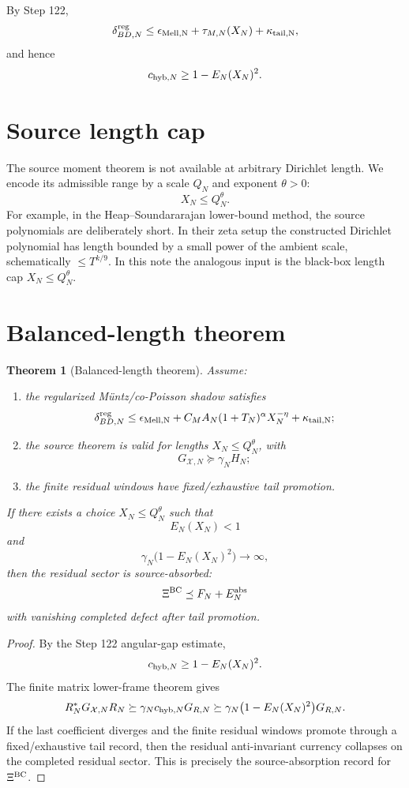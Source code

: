 \documentclass[11pt]{article}
\newtheorem{theorem}{Theorem}
\begin{document}
By Step 122,
\[
\delta^{\rm reg}_{BD,N}\le \epsilon_{\rm Mell,N}+\tau_{M,N}(X_N)+\kappa_{\rm tail,N},
\]
and hence
\[
c_{{\rm hyb},N}\ge 1-E_N(X_N)^2.
\]

\section{Source length cap}
The source moment theorem is not available at arbitrary Dirichlet length.  We encode its admissible range by a scale \(Q_N\) and exponent \(\theta>0\):
\[
X_N\le Q_N^\theta.
\]
For example, in the Heap--Soundararajan lower-bound method, the source polynomials are deliberately short.  In their zeta setup the constructed Dirichlet polynomial has length bounded by a small power of the ambient scale, schematically \(\le T^{k/9}\).  In this note the analogous input is the black-box length cap \(X_N\le Q_N^\theta\).

\section{Balanced-length theorem}
\begin{theorem}[Balanced-length theorem]
Assume:
\begin{enumerate}[label=(\roman*)]
\item the regularized Müntz/co-Poisson shadow satisfies
\[
\delta^{\rm reg}_{BD,N}
\le
\epsilon_{\rm Mell,N}+C_MA_N(1+T_N)^\alpha X_N^{-\eta}+\kappa_{\rm tail,N};
\]
\item the source theorem is valid for lengths \(X_N\le Q_N^\theta\), with
\[
G_{\mathcal X,N}\succeq \gamma_NH_N;
\]
\item the finite residual windows have fixed/exhaustive tail promotion.
\end{enumerate}
If there exists a choice \(X_N\le Q_N^\theta\) such that
\[
E_N(X_N)<1
\]
and
\[
\gamma_N\bigl(1-E_N(X_N)^2\bigr)\to\infty,
\]
then the residual sector is source-absorbed:
\[
\Xi^{\rm BC}\preceq F_N+E_N^{\rm abs}
\]
with vanishing completed defect after tail promotion.
\end{theorem}

\begin{proof}
By the Step 122 angular-gap estimate,
\[
c_{{\rm hyb},N}\ge 1-E_N(X_N)^2.
\]
The finite matrix lower-frame theorem gives
\[
R_N^*G_{\mathcal X,N}R_N
\succeq
\gamma_Nc_{{\rm hyb},N}G_{R,N}
\succeq
\gamma_N\bigl(1-E_N(X_N)^2\bigr)G_{R,N}.
\]
If the last coefficient diverges and the finite residual windows promote through a fixed/exhaustive tail record, then the residual anti-invariant currency collapses on the completed residual sector.  This is precisely the source-absorption record for \(\Xi^{\rm BC}\). \end{proof}
\end{document}
